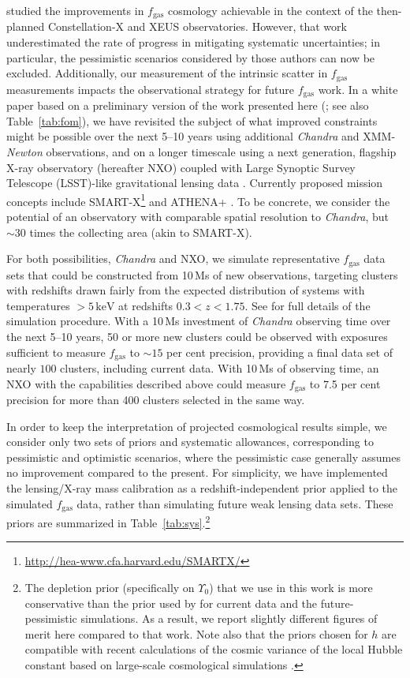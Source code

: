 \documentclass[useAMS,usenatbib,usegraphicx]{mn2e}
\newcommand*{\mysub}[2]{\ensuremath{#1_{\mathrm{#2}}}}
\newcommand*{\unit}[1]{\ensuremath{\mathrm{\, #1}}}
\newcommand*{\fgas}{\mysub{f}{gas}}
\newcommand*{\keV}{\unit{keV}}
\newcommand*{\tabref}{Table}
\newcommand*{\Chandra}{{\it Chandra}}
\begin{document}
\citet*{Rapetti0710.0440} studied the improvements in \fgas{} cosmology achievable in the context of the then-planned Constellation-X and XEUS observatories. However, that work underestimated the rate of progress in mitigating systematic uncertainties; in particular, the pessimistic scenarios considered by those authors can now be excluded. Additionally, our measurement of the intrinsic scatter in \fgas{} measurements impacts the observational strategy for future \fgas{} work. In a white paper based on a preliminary version of the work presented here (\citealt{Allen1307.8152}; see also \tabref~\ref{tab:fom}), we have revisited the subject of what improved constraints might be possible over the next 5--10 years using additional \Chandra{} and XMM-{\it Newton} observations, and on a longer timescale using a next generation, flagship X-ray observatory (hereafter NXO) coupled with Large Synoptic Survey Telescope (LSST)-like gravitational lensing data \citep{LSSTDESC1211.0310}. Currently proposed mission concepts include SMART-X\footnote{\url{http://hea-www.cfa.harvard.edu/SMARTX/}} and ATHENA+ \citep{Nandra1306.2307}. To be concrete, we consider the potential of an observatory with comparable spatial resolution to \Chandra{}, but $\sim30$ times the collecting area (akin to SMART-X).

For both possibilities, \Chandra{} and NXO, we simulate representative \fgas{} data sets that could be constructed from 10\,Ms of new observations, targeting clusters with redshifts drawn fairly from the expected distribution of systems with temperatures $>5\keV$ at redshifts $0.3<z<1.75$. See \citet{Allen1307.8152} for full details of the simulation procedure. With a 10\,Ms investment of \Chandra{} observing time over the next 5--10 years, 50 or more new clusters could be observed with exposures sufficient to measure \fgas{} to $\sim 15$ per cent precision, providing a final data set of nearly $100$ clusters, including current data. With 10\,Ms of observing time, an NXO with the capabilities described above could measure \fgas{} to 7.5 per cent precision for more than 400 clusters selected in the same way.

In order to keep the interpretation of projected cosmological results simple, we consider only two sets of priors and systematic allowances, corresponding to pessimistic and optimistic scenarios, where the pessimistic case generally assumes no improvement compared to the present. For simplicity, we have implemented the lensing/X-ray mass calibration as a redshift-independent prior applied to the simulated \fgas{} data, rather than simulating future weak lensing data sets. These priors are summarized in \tabref~\ref{tab:sys}.\footnote{The depletion prior (specifically on $\Upsilon_0$) that we use in this work is more conservative than the prior used by \citet{Allen1307.8152} for current data and the future-pessimistic simulations. As a result, we report slightly different figures of merit here compared to that work. Note also that the priors chosen for $h$ are compatible with recent calculations of the cosmic variance of the local Hubble constant based on large-scale cosmological simulations \citep{Wojtak1312.0276}.}
\end{document}
